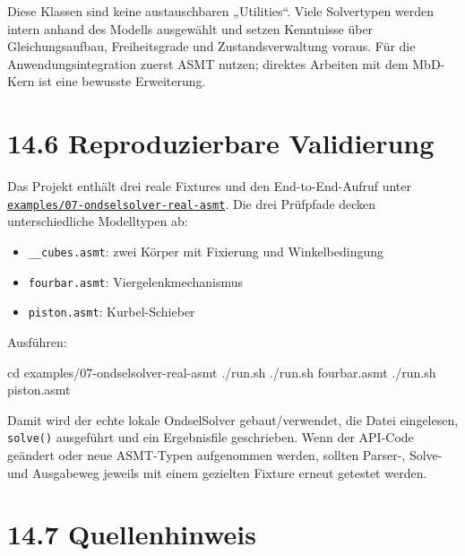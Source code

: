 \documentclass[
  12pt
]{book}
\newenvironment{Shaded}{}{}
\newcommand{\BuiltInTok}[1]{\textcolor[rgb]{0.00,0.50,0.00}{#1}}
\newcommand{\ExtensionTok}[1]{#1}
\newcommand{\NormalTok}[1]{#1}
\providecommand{\tightlist}{%
  \setlength{\itemsep}{0pt}\setlength{\parskip}{0pt}}
\begin{document}
Diese Klassen sind keine austauschbaren „Utilities``. Viele Solvertypen
werden intern anhand des Modells ausgewählt und setzen Kenntnisse über
Gleichungsaufbau, Freiheitsgrade und Zustandsverwaltung voraus. Für die
Anwendungsintegration zuerst ASMT nutzen; direktes Arbeiten mit dem
MbD-Kern ist eine bewusste Erweiterung.

\hypertarget{reproduzierbare-validierung}{%
\section{\texorpdfstring{{14.6} Reproduzierbare
Validierung}{14.6 Reproduzierbare Validierung}}\label{reproduzierbare-validierung}}

Das Projekt enthält drei reale Fixtures und den End-to-End-Aufruf unter
\href{./examples/07-ondselsolver-real-asmt/README.md}{\texttt{examples/07-ondselsolver-real-asmt}}.
Die drei Prüfpfade decken unterschiedliche Modelltypen ab:

\begin{itemize}
\tightlist
\item
  \texttt{\_\_cubes.asmt}: zwei Körper mit Fixierung und Winkelbedingung
\item
  \texttt{fourbar.asmt}: Viergelenkmechanismus
\item
  \texttt{piston.asmt}: Kurbel-Schieber
\end{itemize}

Ausführen:

\begin{Shaded}
\begin{Highlighting}[]
\BuiltInTok{cd}\NormalTok{ examples/07{-}ondselsolver{-}real{-}asmt}
\ExtensionTok{./run.sh}
\ExtensionTok{./run.sh}\NormalTok{ fourbar.asmt}
\ExtensionTok{./run.sh}\NormalTok{ piston.asmt}
\end{Highlighting}
\end{Shaded}

Damit wird der echte lokale OndselSolver gebaut/verwendet, die Datei
eingelesen, \texttt{solve()} ausgeführt und ein Ergebnisfile
geschrieben. Wenn der API-Code geändert oder neue ASMT-Typen aufgenommen
werden, sollten Parser-, Solve- und Ausgabeweg jeweils mit einem
gezielten Fixture erneut getestet werden.

\hypertarget{quellenhinweis}{%
\section{\texorpdfstring{{14.7}
Quellenhinweis}{14.7 Quellenhinweis}}\label{quellenhinweis}}
\end{document}
